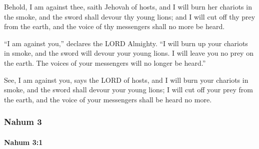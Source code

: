 			\begin{versebox}
					\item[BHS] 
					\item[LXX] 
					\item[ASV] Behold, I am against thee, saith Jehovah of hosts, and I will burn her chariots in the smoke, and the sword shall devour thy young lions; and I will cut off thy prey from the earth, and the voice of thy messengers shall no more be heard.
					\item[NIV] “I am against you,” declares the LORD Almighty. “I will burn up your chariots in smoke, and the sword will devour your young lions. I will leave you no prey on the earth. The voices of your messengers will no longer be heard.”
					\item[NRSV] See, I am against you, says the LORD of hosts, and I will burn your chariots in smoke, and the sword shall devour your young lions; I will cut off your prey from the earth, and the voice of your messengers shall be heard no more.
			\end{versebox}
	\subsubsection{Nahum 3} %
		\label{NAHUM-3}

		\paragraph{Nahum 3:1} %
			\label{NAHUM-3-1}

